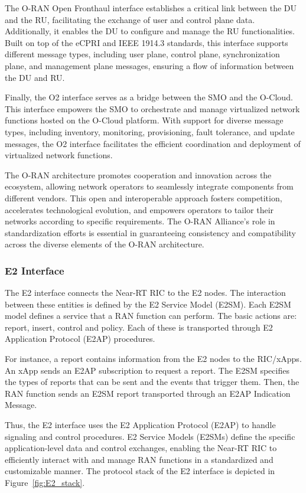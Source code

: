 The O-RAN Open Fronthaul interface establishes a critical link between the DU and the RU, facilitating the exchange of user and control plane data.
Additionally, it enables the DU to configure and manage the RU functionalities.
Built on top of the eCPRI and IEEE 1914.3 standards, this interface supports different message types, including user plane, control plane, synchronization plane, and management plane messages, ensuring a flow of information between the DU and RU\@.

Finally, the O2 interface serves as a bridge between the SMO and the O-Cloud.
This interface empowers the SMO to orchestrate and manage virtualized network functions hosted on the O-Cloud platform.
With support for diverse message types, including inventory, monitoring, provisioning, fault tolerance, and update messages, the O2 interface facilitates the efficient coordination and deployment of virtualized network functions.

The O-RAN architecture promotes cooperation and innovation across the ecosystem, allowing network operators to seamlessly integrate components from different vendors.
This open and interoperable approach fosters competition, accelerates technological evolution, and empowers operators to tailor their networks according to specific requirements.
The O-RAN Alliance's role in standardization efforts is essential in guaranteeing consistency and compatibility across the diverse elements of the O-RAN architecture.


\subsubsection{E2 Interface}\label{subsubsec:protocols}
The E2 interface connects the Near-RT RIC to the E2 nodes.
The interaction between these entities is defined by the E2 Service Model (E2SM).
Each E2SM model defines a service that a RAN function can perform.
The basic actions are: report, insert, control and policy.
Each of these is transported through E2 Application Protocol (E2AP) procedures.

For instance, a report contains information from the E2 nodes to the RIC/xApps.
An xApp sends an E2AP subscription to request a report.
The E2SM specifies the types of reports that can be sent and the events that trigger them.
Then, the RAN function sends an E2SM report transported through an E2AP Indication Message.

Thus, the E2 interface uses the E2 Application Protocol (E2AP) to handle signaling and control procedures.
E2 Service Models (E2SMs) define the specific application-level data and control exchanges, enabling the Near-RT RIC to efficiently interact with and manage RAN functions in a standardized and customizable manner.
The protocol stack of the E2 interface is depicted in Figure~\ref{fig:E2_stack}.

